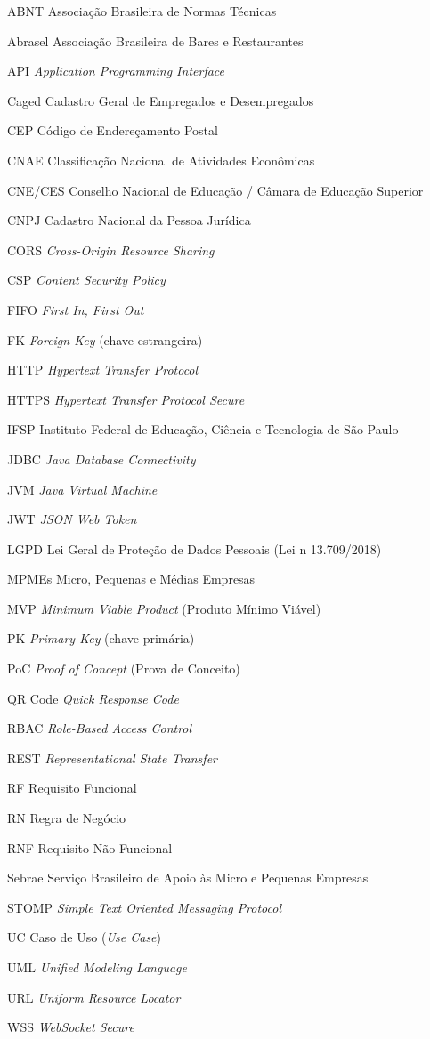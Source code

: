 \begin{siglas}
  \item[ABNT] Associação Brasileira de Normas Técnicas
  \item[Abrasel] Associação Brasileira de Bares e Restaurantes
  \item[API] \textit{Application Programming Interface}
  \item[Caged] Cadastro Geral de Empregados e Desempregados
  \item[CEP] Código de Endereçamento Postal
  \item[CNAE] Classificação Nacional de Atividades Econômicas
  \item[CNE/CES] Conselho Nacional de Educação / Câmara de Educação Superior
  \item[CNPJ] Cadastro Nacional da Pessoa Jurídica
  \item[CORS] \textit{Cross-Origin Resource Sharing}
  \item[CSP] \textit{Content Security Policy}
  \item[FIFO] \textit{First In, First Out}
  \item[FK] \textit{Foreign Key} (chave estrangeira)
  \item[HTTP] \textit{Hypertext Transfer Protocol}
  \item[HTTPS] \textit{Hypertext Transfer Protocol Secure}
  \item[IFSP] Instituto Federal de Educação, Ciência e Tecnologia de São Paulo
  \item[JDBC] \textit{Java Database Connectivity}
  \item[JVM] \textit{Java Virtual Machine}
  \item[JWT] \textit{JSON Web Token}
  \item[LGPD] Lei Geral de Proteção de Dados Pessoais (Lei n{\textordmasculine} 13.709/2018)
  \item[MPMEs] Micro, Pequenas e Médias Empresas
  \item[MVP] \textit{Minimum Viable Product} (Produto Mínimo Viável)
  \item[PK] \textit{Primary Key} (chave primária)
  \item[PoC] \textit{Proof of Concept} (Prova de Conceito)
  \item[QR Code] \textit{Quick Response Code}
  \item[RBAC] \textit{Role-Based Access Control}
  \item[REST] \textit{Representational State Transfer}
  \item[RF] Requisito Funcional
  \item[RN] Regra de Negócio
  \item[RNF] Requisito Não Funcional
  \item[Sebrae] Serviço Brasileiro de Apoio às Micro e Pequenas Empresas
  \item[STOMP] \textit{Simple Text Oriented Messaging Protocol}
  \item[UC] Caso de Uso (\textit{Use Case})
  \item[UML] \textit{Unified Modeling Language}
  \item[URL] \textit{Uniform Resource Locator}
  \item[WSS] \textit{WebSocket Secure}
\end{siglas}

